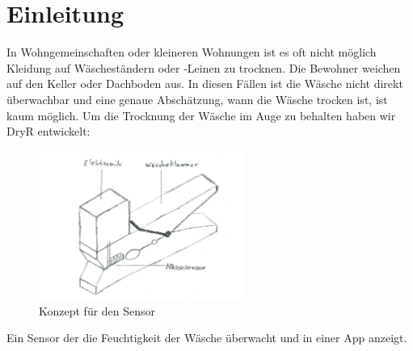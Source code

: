 \section{Einleitung}
	In Wohngemeinschaften oder kleineren Wohnungen ist es oft nicht möglich Kleidung auf Wäscheständern oder -Leinen zu trocknen. Die Bewohner weichen auf den Keller oder Dachboden aus. In diesen Fällen ist die Wäsche nicht direkt überwachbar und eine genaue Abschätzung, wann die Wäsche trocken ist, ist kaum möglich.
Um die Trocknung der Wäsche im Auge zu behalten haben wir DryR entwickelt:
			\begin{figure}[htb] 
				\centerline{\includegraphics[width=0.6\textwidth]{01-klammer.png}}
				\caption{Konzept für den Sensor}
				\label{einleitung_klammer}
			\end{figure}
Ein Sensor der die Feuchtigkeit der Wäsche überwacht und in einer App anzeigt.
